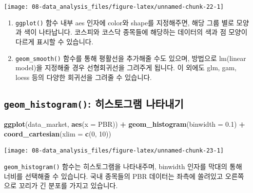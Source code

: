 \documentclass[12pt,]{book}
\newenvironment{Shaded}{\begin{snugshade}}{\end{snugshade}}
\newcommand{\DataTypeTok}[1]{\textcolor[rgb]{0.13,0.29,0.53}{#1}}
\newcommand{\DecValTok}[1]{\textcolor[rgb]{0.00,0.00,0.81}{#1}}
\newcommand{\FloatTok}[1]{\textcolor[rgb]{0.00,0.00,0.81}{#1}}
\newcommand{\KeywordTok}[1]{\textcolor[rgb]{0.13,0.29,0.53}{\textbf{#1}}}
\newcommand{\NormalTok}[1]{#1}
\newcommand{\OperatorTok}[1]{\textcolor[rgb]{0.81,0.36,0.00}{\textbf{#1}}}
\newcommand{\StringTok}[1]{\textcolor[rgb]{0.31,0.60,0.02}{#1}}
\providecommand{\tightlist}{%
  \setlength{\itemsep}{0pt}\setlength{\parskip}{0pt}}
\begin{document}
\begin{center}\texttt{[image: 08-data\_analysis\_files/figure-latex/unnamed-chunk-22-1]} \end{center}

\begin{enumerate}
\def\labelenumi{\arabic{enumi}.}
\tightlist
\item
  \texttt{ggplot()} 함수 내부 aes 인자에 color와 shape를 지정해주면, 해당 그룹 별로 모양과 색이 나타납니다. 코스피와 코스닥 종목들에 해당하는 데이터의 색과 점 모양이 다르게 표시할 수 있습니다.
\item
  \texttt{geom\_smooth()} 함수를 통해 평활선을 추가해줄 수도 있으며, 방법으로 lm(linear model)을 지정해줄 경우 선형회귀선을 그려주게 됩니다. 이 외에도 glm, gam, loess 등의 다양한 회귀선을 그려줄 수 있습니다.
\end{enumerate}

\hypertarget{geom_histogram--}{%
\subsection{\texorpdfstring{\texttt{geom\_histogram()}: 히스토그램 나타내기}{geom\_histogram(): 히스토그램 나타내기}}\label{geom_histogram--}}

\begin{Shaded}
\begin{Highlighting}[]
\KeywordTok{ggplot}\NormalTok{(data_market, }\KeywordTok{aes}\NormalTok{(}\DataTypeTok{x =}\NormalTok{ PBR)) }\OperatorTok{+}
\StringTok{  }\KeywordTok{geom_histogram}\NormalTok{(}\DataTypeTok{binwidth =} \FloatTok{0.1}\NormalTok{) }\OperatorTok{+}\StringTok{ }
\StringTok{  }\KeywordTok{coord_cartesian}\NormalTok{(}\DataTypeTok{xlim =} \KeywordTok{c}\NormalTok{(}\DecValTok{0}\NormalTok{, }\DecValTok{10}\NormalTok{))}
\end{Highlighting}
\end{Shaded}

\begin{center}\texttt{[image: 08-data\_analysis\_files/figure-latex/unnamed-chunk-23-1]} \end{center}

\texttt{geom\_histogram()} 함수는 히스토그램을 나타내주며, binwidth 인자를 막대의 통해 너비를 선택해줄 수 있습니다. 국내 종목들의 PBR 데이터는 좌측에 쏠려있고 오른쪽으로 꼬리가 긴 분포를 가지고 있습니다.
\end{document}
